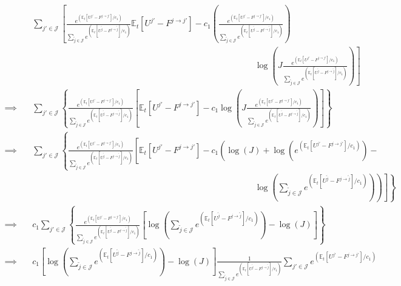 \documentclass[
  letterpaper,
  DIV=11,
  numbers=noendperiod]{scrreprt}
\begin{document}
\begin{align*}
& \sum_{j'\in \mathcal{J}} \left[ \frac{e^{\left(\mathbb{E}_t\left[U^{j'} - F^{j \to j'}\right] /c_1\right)}}{\sum_{\tilde{j}\in \mathcal{J}}e^{\left(\mathbb{E}_t\left[U^{\tilde{j}} - F^{j \to \tilde{j}}\right] /c_1\right)}}\mathbb{E}_t\left[U^{j'} - F^{j \to j'} \right]
- c_1\left( \frac{e^{\left(\mathbb{E}_t\left[U^{j'} - F^{j \to j'}\right] /c_1\right)}}{\sum_{\tilde{j}\in \mathcal{J}}e^{\left(\mathbb{E}_t\left[U^{\tilde{j}} - F^{j \to \tilde{j}}\right] /c_1\right)}}\right) \right. \\
& \left. \hspace{11cm}\log{\left(J \frac{e^{\left(\mathbb{E}_t\left[U^{j'} - F^{j \to j'}\right] /c_1\right)}}{\sum_{\tilde{j}\in \mathcal{J}}e^{\left(\mathbb{E}_t\left[U^{\tilde{j}} - F^{j \to \tilde{j}}\right] /c_1\right)}}\right)} \right]\\
\implies \quad & \sum_{j'\in \mathcal{J}} \left\{\frac{e^{\left(\mathbb{E}_t\left[U^{j'} - F^{j \to j'}\right] /c_1\right)}}{\sum_{\tilde{j}\in \mathcal{J}}e^{\left(\mathbb{E}_t\left[U^{\tilde{j}} - F^{j \to \tilde{j}}\right] /c_1\right)}} \left[\mathbb{E}_t\left[U^{j'} - F^{j \to j'} \right]
- c_1\log{\left(J \frac{e^{\left(\mathbb{E}_t\left[U^{j'} - F^{j \to j'}\right] /c_1\right)}}{\sum_{\tilde{j}\in \mathcal{J}}e^{\left(\mathbb{E}_t\left[U^{\tilde{j}} - F^{j \to \tilde{j}}\right] /c_1\right)}}\right)} \right]\right\}\\
  \implies \quad & 
\sum_{j'\in \mathcal{J}} \left\{\frac{e^{\left(\mathbb{E}_t\left[U^{j'} - F^{j \to j'}\right] /c_1\right)}}{\sum_{\tilde{j}\in \mathcal{J}}e^{\left(\mathbb{E}_t\left[U^{\tilde{j}} - F^{j \to \tilde{j}}\right] /c_1\right)}} \left[{\mathbb{E}_t\left[U^{j'} - F^{j \to j'} \right]}
- c_1\left(\log{\left(J\right)} + {\log{\left(e^{\left(\mathbb{E}_t\left[U^{j'} - F^{j \to j'}\right] /c_1\right)}\right)}}- \right.\right.\right. \\
&\left.\left.\left. \hspace{11cm}   \log{\left(\sum_{\tilde{j}\in \mathcal{J}}e^{\left(\mathbb{E}_t\left[U^{\tilde{j}} - F^{j \to \tilde{j}}\right] /c_1\right)}\right)}\right)\right]\right\}\\   \implies\quad&
c_1\sum_{j'\in \mathcal{J}}\left\{ \frac{e^{\left(\mathbb{E}_t\left[U^{j'} - F^{j \to j'}\right] /c_1\right)}}{\sum_{\tilde{j}\in \mathcal{J}}e^{\left(\mathbb{E}_t\left[U^{\tilde{j}} - F^{j \to \tilde{j}}\right] /c_1\right)}} \left[
\log{\left(\sum_{\tilde{j}\in \mathcal{J}}e^{\left(\mathbb{E}_t\left[U^{\tilde{j}} - F^{j \to \tilde{j}}\right] /c_1\right)}\right)} - \log{\left(J\right)} \right]\right\}\\
\implies\quad&c_1\left[
\log{\left(\sum_{\tilde{j}\in \mathcal{J}}e^{\left(\mathbb{E}_t\left[U^{\tilde{j}} - F^{j \to \tilde{j}}\right] /c_1\right)}\right)} - \log{\left(J\right)} \right] {\frac{1}{\sum_{\tilde{j}\in \mathcal{J}}e^{\left(\mathbb{E}_t\left[U^{\tilde{j}} - F^{j \to \tilde{j}}\right] /c_1\right)}} }{\sum_{j'\in \mathcal{J}}e^{\left(\mathbb{E}_t\left[U^{j'} - F^{j \to j'}\right] /c_1\right)}} 
\end{align*}
\end{document}
